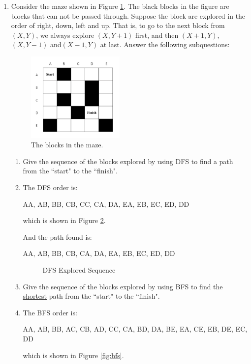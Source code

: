 \documentclass[12pt,a4paper]{article}
\makeatletter
\newtheorem*{solution}{Solution}
\theoremstyle{definition}
\renewenvironment{solution}[1][Solution] {\par\pushQED{\qed}\normalfont\topsep6\p@\@plus6\p@\relax\trivlist\item[\hskip\labelsep\bfseries#1\@addpunct{.}]\ignorespaces}{\popQED\endtrivlist\@endpefalse} \makeatother
\makeatother
\begin{document}
\begin{enumerate}
    \item Consider the maze shown in Figure \ref{Fig-Maze}. The black blocks in the figure are blocks that can not be passed through. Suppose the block are explored in the order of right, down, left and up. That is, to go to the next block from $(X,Y)$, we always explore $(X,Y+1)$ first, and then $(X+1,Y)$,$(X,Y-1)$ and$(X-1,Y)$ at last. Answer the following subquestions:
    \begin{figure}[!htbp]
        \centering
        \includegraphics[width=0.45\textwidth]{Fig-Maze.pdf}
        \caption{The blocks in the maze.}
        \label{Fig-Maze}
    \end{figure}
    \begin{enumerate}
        \item Give the sequence of the blocks explored by using DFS to find a path from the ``start" to the ``finish".
        \begin{solution}
            The DFS order is:
            \begin{tcolorbox}
                AA, AB, BB, CB, CC, CA, DA, EA, EB, EC, ED, DD
            \end{tcolorbox}
            which is shown in Figure \ref{fig:dfs}.

            And the path found is:
            \begin{tcolorbox}
                AA, AB, BB, CB, CA, DA, EA, EB, EC, ED, DD
            \end{tcolorbox}

            \begin{figure}[h]
                \centering
                
                \caption{DFS Explored Sequence}
                \label{fig:dfs}
            \end{figure}
            
        \end{solution}
        \item Give the sequence of the blocks explored by using BFS to find the \underline{shortest} path from the ``start" to the ``finish".
        \begin{solution}
            The BFS order is:
            \begin{tcolorbox}
                AA, AB, BB, AC, CB, AD, CC, CA, BD, DA, BE, EA, CE, EB, DE, EC, DD
            \end{tcolorbox}
            which is shown in Figure \ref{fig:bfs}.


\end{solution}
\end{enumerate}
\end{enumerate}
\end{document}
